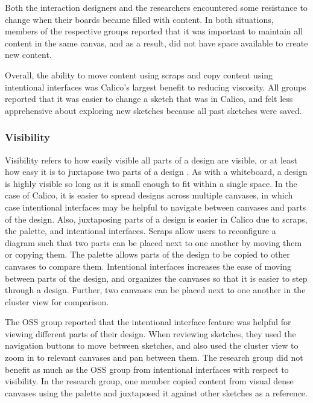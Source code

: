 Both the interaction designers and the researchers encountered some resistance to change when their boards became filled with content. In both situations, members of the respective groups reported that it was important to maintain all content in the same canvas, and as a result, did not have space available to create new content.

Overall, the ability to move content using scraps and copy content using intentional interfaces was Calico's largest benefit to reducing viscosity. All groups reported that it was easier to change a sketch that was in Calico, and felt less apprehensive about exploring new sketches because all past sketches were saved.


\subsubsection{Visibility}

Visibility refers to how easily visible all parts of a design are visible, or at least how easy it is to juxtapose two parts of a design \cite{Petre2013BookChapter}. As with a whiteboard, a design is highly visible so long as it is small enough to fit within a single space. In the case of Calico, it is easier to spread designs across multiple canvases, in which case intentional interfaces may be helpful to navigate between canvases and parts of the design. Also, juxtaposing parts of a design is easier in Calico due to scraps, the palette, and intentional interfaces. Scraps allow users to reconfigure a diagram such that two parts can be placed next to one another by moving them or copying them. The palette allows parts of the design to be copied to other canvases to compare them. Intentional interfaces increases the ease of moving between parts of the design, and organizes the canvases so that it is easier to step through a design. Further, two canvases can be placed next to one another in the cluster view for comparison.

The OSS group reported that the intentional interface feature was helpful for viewing different parts of their design. When reviewing sketches, they used the navigation buttons to move between sketches, and also used the cluster view to zoom in to relevant canvases and pan between them. The research group did not benefit as much as the OSS group from intentional interfaces with respect to visibility. In the research group, one member copied content from visual dense canvases using the palette and juxtaposed it against other sketches as a reference.

